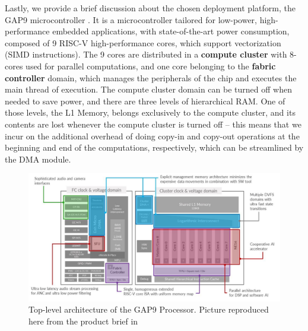 Lastly, we provide a brief discussion about the chosen deployment platform, the GAP9 microcontroller \cite{GWGAP9}. 
It is a microcontroller tailored for low-power, high-performance embedded applications, with state-of-the-art power consumption, composed of 9 RISC-V high-performance
cores, which support vectorization (SIMD instructions). The 9 cores are distributed in a \textbf{compute cluster} with 8-cores used for parallel computations, and one core
belonging to the \textbf{fabric controller} domain, which manages the peripherals of the chip and executes the main thread of execution. The compute cluster domain
can be turned off when needed to save power, and there are three levels of hierarchical RAM. One of those levels, the L1 Memory, belongs exclusively to the compute cluster,
and its contents are lost whenever the compute cluster is turned off -- this means that we incur on the additional overhead of doing copy-in and copy-out operations at the beginning
and end of the computations, respectively, which can be streamlined by the DMA module.

\begin{figure}[h!]
    \centering
    \includegraphics[width=\textwidth]{fig/gap9_toplevel.png}
    \caption{Top-level architecture of the GAP9 Processor. Picture reproduced here from the product brief in \cite{GWGAP9}}
    \label{fig:gap9_toplevel}
\end{figure}